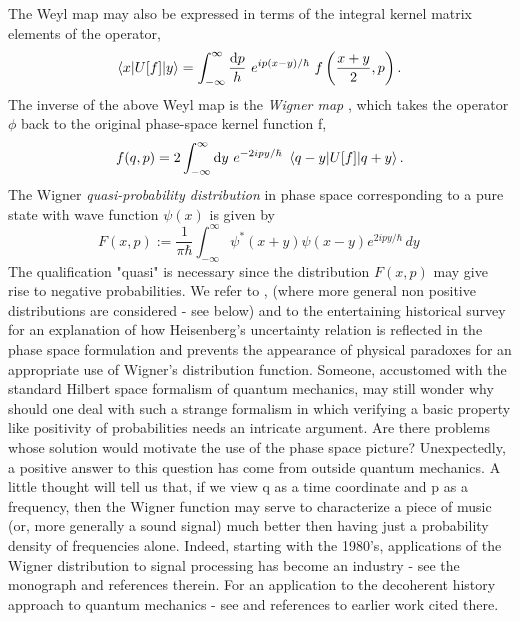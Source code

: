 \documentclass[12pt]{article}
\begin{document}
The Weyl map may also be expressed in terms of the integral kernel matrix elements of the operator,
\begin{equation}
\label{kern}
    \left\langle x| U [f] |y \right\rangle = \int_{-\infty}^\infty {{\rm d}p\over h} ~e^{ip(x-y)/\hbar}~ f\left({x+y\over2},p\right) . 
\end{equation}
The inverse of the above Weyl map is the {\it Wigner map} \cite{W32}, which takes the operator $\phi$ back to the original phase-space kernel function f,
\begin{equation}
\label{Wigner}
    f(q,p)= 2 \int_{-\infty}^\infty {\rm d}y~e^{-2ipy/\hbar}~ \left\langle q-y| U [f] |q+y \right\rangle. 
\end{equation}
The Wigner {\it quasi-probability distribution} in phase space corresponding to a pure state with wave function $\psi(x)$ is given by
\begin{equation}
\label{Wigpsi}
    F(x,p):= \frac{1}{\pi\hbar}\int_{-\infty}^\infty \psi^*(x+y)\psi(x-y)e^{2ipy/\hbar}\,dy\, 
\end{equation}
The qualification "quasi" is necessary since the distribution $F(x, p)$ may give rise to negative probabilities. We refer to \cite{M86}, \cite{Fe} (where more general non positive distributions are considered - see below) and to the entertaining historical survey \cite{CZ} for an explanation of how Heisenberg's uncertainty relation is reflected in the phase space formulation and prevents the appearance of physical paradoxes for an appropriate use of Wigner's distribution function. Someone, accustomed with the standard Hilbert space formalism of quantum mechanics, may still wonder why should one deal with such a strange formalism in which verifying a basic property like positivity of probabilities needs an intricate argument. Are there problems whose solution would motivate the use of the phase space picture?  Unexpectedly, a positive answer to this question has come from outside quantum mechanics. A little thought will tell us that, if we view q as a time coordinate and p as a frequency, then the Wigner function may serve to characterize a piece of music (or, more generally a sound signal) much better then having just a probability density of frequencies alone. Indeed, starting with the 1980's, applications of the Wigner distribution to signal processing has become an industry - see the monograph \cite{MH} and references therein. For an application to the decoherent history approach to quantum mechanics - see \cite{GH} and references to earlier work cited there. 
\end{document}
